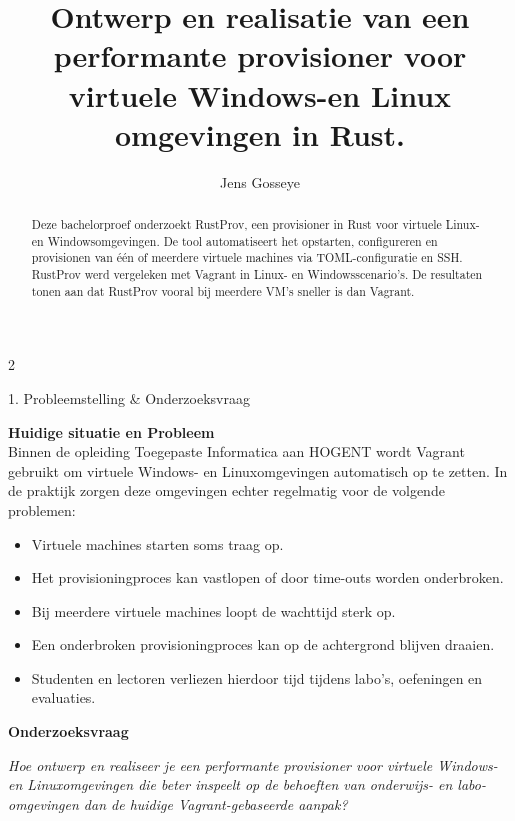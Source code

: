 \documentclass[a0,portrait]{hogent-poster}
\title{Ontwerp en realisatie van een performante provisioner voor virtuele Windows-en Linux omgevingen in Rust.}
\author{Jens Gosseye}
\begin{document}
\maketitle

\begin{abstract}
Deze bachelorproef onderzoekt RustProv, een provisioner in Rust voor virtuele Linux- en Windowsomgevingen. De tool automatiseert het opstarten, configureren en provisionen van één of meerdere virtuele machines via TOML-configuratie en SSH. RustProv werd vergeleken met Vagrant in Linux- en Windowsscenario's. De resultaten tonen aan dat RustProv vooral bij meerdere VM's sneller is dan Vagrant.
\end{abstract}

\begin{multicols}{2} %

\begin{posterbox}{1. Probleemstelling \& Onderzoeksvraag}

\textbf{Huidige situatie en Probleem} \\
Binnen de opleiding Toegepaste Informatica aan HOGENT wordt Vagrant gebruikt om virtuele Windows- en Linuxomgevingen automatisch op te zetten. In de praktijk zorgen deze omgevingen echter regelmatig voor de volgende problemen:

\begin{itemize}
    \item Virtuele machines starten soms traag op.
    \item Het provisioningproces kan vastlopen of door time-outs worden onderbroken.
    \item Bij meerdere virtuele machines loopt de wachttijd sterk op.
    \item Een onderbroken provisioningproces kan op de achtergrond blijven draaien.
    \item Studenten en lectoren verliezen hierdoor tijd tijdens labo's, oefeningen en evaluaties.
\end{itemize}
\textbf{Onderzoeksvraag}
\begin{tcolorbox}[
    colback=gray!10,
    colframe=gray!50,
    leftrule=0pt,
    rightrule=0pt,
    toprule=1pt,
    bottomrule=1pt,
    arc=0pt,
    sharp corners,
    left=3mm,
    right=3mm
]

\textit{Hoe ontwerp en realiseer je een performante provisioner voor virtuele Windows- en Linuxomgevingen die beter inspeelt op de behoeften van onderwijs- en labo-omgevingen dan de huidige Vagrant-gebaseerde aanpak?}
\end{tcolorbox}


\end{posterbox}
\end{multicols}
\end{document}
